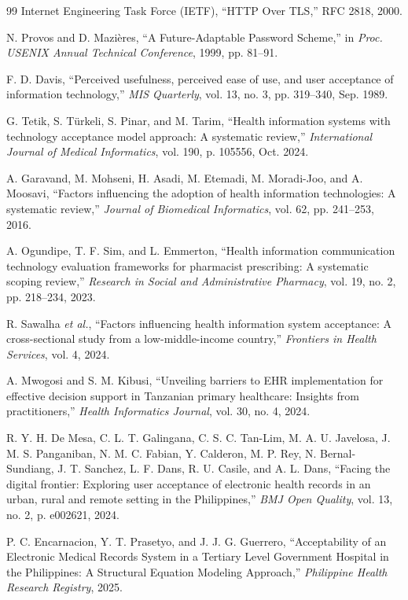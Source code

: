 \documentclass[12pt, a4paper]{report}
\begin{document}
\begin{thebibliography}{99}
Internet Engineering Task Force (IETF), ``HTTP Over TLS,'' RFC 2818, 2000.

N. Provos and D. Mazières, ``A Future-Adaptable Password Scheme,'' in \textit{Proc. USENIX Annual Technical Conference}, 1999, pp. 81--91.

F. D. Davis, ``Perceived usefulness, perceived ease of use, and user acceptance of information technology,'' \textit{MIS Quarterly}, vol. 13, no. 3, pp. 319--340, Sep. 1989.

G. Tetik, S. Türkeli, S. Pinar, and M. Tarim, ``Health information systems with technology acceptance model approach: A systematic review,'' \textit{International Journal of Medical Informatics}, vol. 190, p. 105556, Oct. 2024.

A. Garavand, M. Mohseni, H. Asadi, M. Etemadi, M. Moradi-Joo, and A. Moosavi, ``Factors influencing the adoption of health information technologies: A systematic review,'' \textit{Journal of Biomedical Informatics}, vol. 62, pp. 241--253, 2016.

A. Ogundipe, T. F. Sim, and L. Emmerton, ``Health information communication technology evaluation frameworks for pharmacist prescribing: A systematic scoping review,'' \textit{Research in Social and Administrative Pharmacy}, vol. 19, no. 2, pp. 218--234, 2023.

R. Sawalha \textit{et al.}, ``Factors influencing health information system acceptance: A cross-sectional study from a low-middle-income country,'' \textit{Frontiers in Health Services}, vol. 4, 2024.

A. Mwogosi and S. M. Kibusi, ``Unveiling barriers to EHR implementation for effective decision support in Tanzanian primary healthcare: Insights from practitioners,'' \textit{Health Informatics Journal}, vol. 30, no. 4, 2024.

R. Y. H. De Mesa, C. L. T. Galingana, C. S. C. Tan-Lim, M. A. U. Javelosa, J. M. S. Panganiban, N. M. C. Fabian, Y. Calderon, M. P. Rey, N. Bernal-Sundiang, J. T. Sanchez, L. F. Dans, R. U. Casile, and A. L. Dans, ``Facing the digital frontier: Exploring user acceptance of electronic health records in an urban, rural and remote setting in the Philippines,'' \textit{BMJ Open Quality}, vol. 13, no. 2, p. e002621, 2024.

P. C. Encarnacion, Y. T. Prasetyo, and J. J. G. Guerrero, ``Acceptability of an Electronic Medical Records System in a Tertiary Level Government Hospital in the Philippines: A Structural Equation Modeling Approach,'' \textit{Philippine Health Research Registry}, 2025.


\end{thebibliography}
\end{document}
